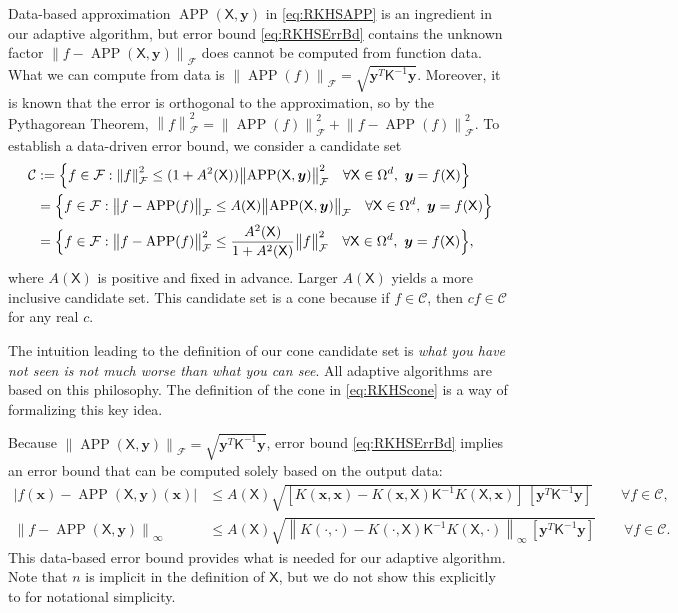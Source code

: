 \documentclass[]{mcom-l}
\theoremstyle{remark}
\DeclareMathOperator{\APP}{APP}
\newcommand{\mK}{\mathsf{K}}
\newcommand{\mX}{\mathsf{X}}
\newcommand{\bx}{{\boldsymbol{x}}}
\newcommand{\by}{{\boldsymbol{y}}}
\newcommand{\calc}{{\mathcal{C}}}
\newcommand{\calf}{{\mathcal{F}}}
\def\abs#1{\ensuremath{\left \lvert #1 \right \rvert}}
\newcommand{\norm}[2][{}]{\ensuremath{\left \lVert #2 \right \rVert}_{#1}}
\newcommand{\bignorm}[2][{}]{\ensuremath{\bigl \lVert #2 \bigr \rVert}_{#1}}
\begin{document}
Data-based approximation $\APP(\mX,\by)$ in \eqref{eq:RKHSAPP} is an ingredient in our adaptive algorithm, but error bound \eqref{eq:RKHSErrBd} contains the unknown factor $\norm[\calf]{f - \APP(\mX,\by)}$ does cannot be computed from function data.  What we can compute from data is $\bignorm[\calf]{\APP(f)} = \sqrt{\by^T \mK^{-1} \by}$.  Moreover, it is known that the error is orthogonal to the approximation, so by the Pythagorean Theorem,  $\norm[\calf]{f}^2  = \bignorm[\calf]{\APP(f)}^2 + \bignorm[\calf]{f - \APP(f)}^2$.  To establish a data-driven error bound, we consider a candidate set
\begin{align} \label{eq:RKHScone}
\calc &:= \Bigl\{f \in \calf : \norm[\calf]{f}^2 \le (1 + A^2(\mX)) \bignorm[\calf]{\APP(\mX,\by)}^2 \quad \forall \mX \in \Omega^d, \ \by = f(\mX) \Bigr \} \\
\nonumber
& = \Bigl \{f \in \calf : \bignorm[\calf]{f - \APP(f)} \le A(\mX) \bignorm[\calf]{\APP(\mX,\by)} \quad \forall \mX \in \Omega^d, \ \by = f(\mX) \Bigr \} \\
\nonumber
& = \Bigl \{f \in \calf : \bignorm[\calf]{f - \APP(f)}^2 \le \frac{A^2(\mX)}{1 + A^2(\mX)} \bignorm[\calf]{f}^2 \quad \forall \mX \in \Omega^d, \ \by = f(\mX) \Bigr \},
\end{align}
where $A(\mX)$ is positive and fixed in advance. Larger $A(\mX)$ yields a more inclusive candidate set.  This candidate set is a cone because if $f \in \calc$, then $c f \in \calc$ for any real $c$. 

The intuition leading to the definition of our cone candidate set is \emph{what you have not seen is not much worse than what you can see}. All adaptive algorithms are based on this philosophy. The definition of the cone in \eqref{eq:RKHScone} is a way of formalizing this key idea. 

Because $\bignorm[\calf]{\APP(\mX,\by)} = \sqrt{\by^T \mK^{-1} \by}$, error bound \eqref{eq:RKHSErrBd} implies an error bound that can be computed solely based on the output data: 
\begin{subequations} \label{eq:DataErrBd}
\begin{align}
\label{eq:DataErrBdA}
    \abs{f(\bx) - \APP(\mX,\by)(\bx)} & \le   A(\mX) \sqrt{[K(\bx,\bx) - K(\bx,\mX) \mK^{-1} K(\mX,\bx) ] \, [\by^T \mK^{-1} \by] } \qquad \forall f \in \calc, \\
    \label{eq:DataErrBdB}
    \norm[\infty]{f - \APP(\mX,\by)} & \le   A(\mX) \sqrt{\norm[\infty]{K(\cdot,\cdot) - K(\cdot,\mX) \mK^{-1} K(\mX,\cdot)} \, [\by^T \mK^{-1} \by] } \qquad \forall f \in \calc.
\end{align}
\end{subequations}
This data-based error bound provides what is needed for our adaptive algorithm.  Note that $n$ is implicit in the definition of $\mX$, but we do not show this explicitly to for notational simplicity.
\end{document}
